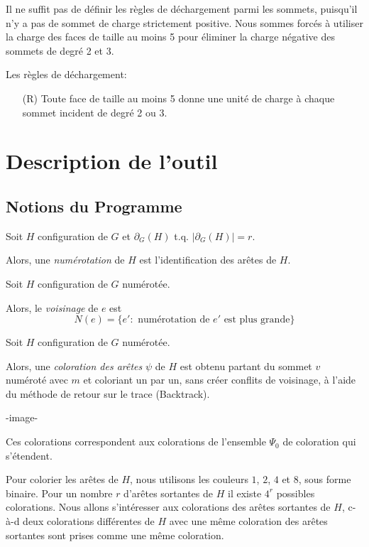 \documentclass{beamer}
\begin{document}
\begin{frame}
Il ne suffit pas de définir les règles de déchargement parmi les sommets, puisqu'il n'y a pas de sommet de charge strictement positive. Nous sommes forcés à utiliser la charge des faces de taille au moins 5 pour éliminer la charge négative des sommets de degré 2 et 3.

Les règles de déchargement:

\begin{enumerate}
\item [(R)] Toute face de taille au moins 5 donne une unité de charge à chaque sommet incident de degré 2 ou 3.
\end{enumerate}
\end{frame}
\section{Description de l'outil}
\subsection{Notions du Programme}
\begin{frame}
Soit $H$ configuration de $G$ et $\partial_G(H)$ t.q. $|\partial_G(H)|=r$. 

Alors, une \emph{numérotation} de $H$ est l'identification des arêtes de $H$.

\pause

Soit $H$ configuration de $G$ numérotée. 

Alors, le \emph{voisinage} de $e$ est 
$$
N(e) = \{e': \textrm{ numérotation de $e'$ est plus grande}\}
$$
\end{frame}

\begin{frame}
Soit $H$ configuration de $G$ numérotée. 

Alors, une \emph{coloration des arêtes} $\psi$ de $H$ est obtenu partant du sommet $v$ numéroté avec $m$ et coloriant un par un, sans créer conflits de voisinage, à l'aide du méthode de retour sur le trace (Backtrack).

\pause

-image-
\end{frame}

\begin{frame}
Ces colorations correspondent aux colorations de l'ensemble $\Psi_0$ de coloration qui s'étendent.

\pause

Pour colorier les arêtes de $H$, nous utilisons les couleurs $1$, $2$, $4$ et $8$, sous forme binaire. Pour un nombre $r$ d'arêtes sortantes de $H$ il existe $4^r$ possibles colorations. Nous allons s'intéresser aux colorations des arêtes sortantes de $H$, c-à-d deux colorations différentes de $H$ avec une même coloration des arêtes sortantes sont prises comme une même coloration.
\end{frame}
\end{document}
